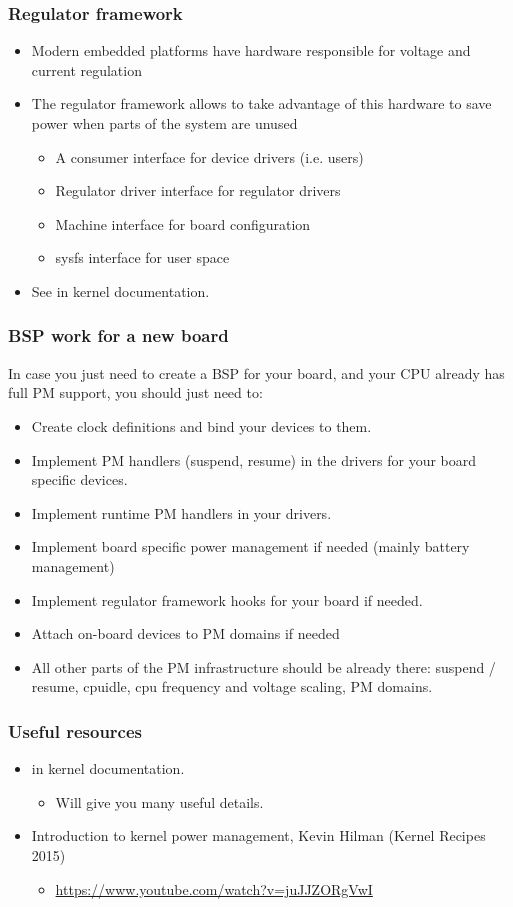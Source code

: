 \begin{frame}
  \frametitle{Regulator framework}
  \begin{itemize}
  \item Modern embedded platforms have hardware responsible for voltage
    and current regulation
  \item The regulator framework allows to take advantage of this
    hardware to save power when parts of the system are unused
    \begin{itemize}
    \item A consumer interface for device drivers (i.e. users)
    \item Regulator driver interface for regulator drivers
    \item Machine interface for board configuration
    \item sysfs interface for user space
    \end{itemize}
  \item See  in kernel documentation.
  \end{itemize}
\end{frame}

\begin{frame}
  \frametitle{BSP work for a new board}
  In case you just need to create a BSP for your board, and your
  CPU already has full PM support, you should just need to:
  \begin{itemize}
  \item Create clock definitions and bind your devices to them.
  \item Implement PM handlers (suspend, resume) in the drivers for
    your board specific devices.
  \item Implement runtime PM handlers in your drivers.
  \item Implement board specific power management if needed (mainly
    battery management)
  \item Implement regulator framework hooks for your board if
    needed.
  \item Attach on-board devices to PM domains if needed
  \item All other parts of the PM infrastructure should be already
    there: suspend / resume, cpuidle, cpu frequency and voltage
    scaling, PM domains.
  \end{itemize}
\end{frame}

\begin{frame}
  \frametitle{Useful resources}
  \begin{itemize}
  \item {} in kernel documentation.
    \begin{itemize}
    \item Will give you many useful details.
    \end{itemize}
  \item Introduction to kernel power management, Kevin Hilman (Kernel Recipes 2015)
    \begin{itemize}
      \item \url{https://www.youtube.com/watch?v=juJJZORgVwI}
    \end{itemize}
  \end{itemize}
\end{frame}
